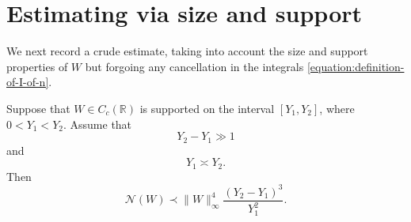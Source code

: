 \documentclass[reqno]{amsart} 
\begin{document}
\section{Estimating via size and support}\label{sec:cqx50az3z1}
We next record a crude estimate, taking into account the size and support properties of $W$ but forgoing any cancellation in the integrals \eqref{equation:definition-of-I-of-n}.
\begin{lemma}\label{lemma:crude-bound}
  Suppose that $W \in C_c(\mathbb{R})$ is supported on the interval $[Y_1, Y_2]$, where $0 < Y_1 < Y_2$.  Assume that
  \begin{equation}\label{eqn:Y2-Y1-separated}
    Y_2 - Y_1 \gg 1
  \end{equation}
  and
  \begin{equation}\label{eqn:Y1-Y2-same-size}
    Y_1 \asymp Y_2.
  \end{equation}
  Then
  \begin{equation*}
    \mathcal{N}(W) \prec
    \lVert W \rVert_{\infty}^4 \frac{(Y_2 - Y_1)^3 }{Y_1^2}.
  \end{equation*}
\end{lemma}
\end{document}
